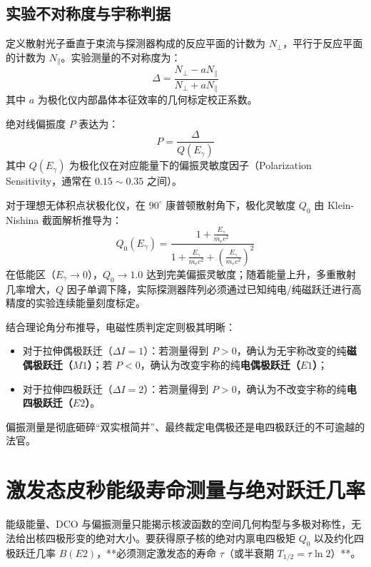 \subsection{实验不对称度与宇称判据}

定义散射光子垂直于束流与探测器构成的反应平面的计数为 $N_\perp$，平行于反应平面的计数为 $N_\parallel$。实验测量的不对称度为：
\begin{equation}
    \Delta = \frac{N_\perp - a N_\parallel}{N_\perp + a N_\parallel}
\end{equation}
其中 $a$ 为极化仪内部晶体本征效率的几何标定校正系数。

绝对线偏振度 $P$ 表达为：
\begin{equation}
    P = \frac{\Delta}{Q(E_\gamma)}
\end{equation}
其中 $Q(E_\gamma)$ 为极化仪在对应能量下的偏振灵敏度因子（Polarization Sensitivity，通常在 $0.15 \sim 0.35$ 之间）。

对于理想无体积点状极化仪，在 $90^\circ$ 康普顿散射角下，极化灵敏度 $Q_0$ 由 Klein-Nishina 截面解析推导为：
\begin{equation}
    Q_0(E_\gamma) = \frac{1 + \frac{E_\gamma}{m_e c^2}}{1 + \frac{E_\gamma}{m_e c^2} + \left(\frac{E_\gamma}{m_e c^2}\right)^2}
    \label{eq:polarimeter_sensitivity}
\end{equation}
在低能区（$E_\gamma \to 0$），$Q_0 \to 1.0$ 达到完美偏振灵敏度；随着能量上升，多重散射几率增大，$Q$ 因子单调下降，实际探测器阵列必须通过已知纯电/纯磁跃迁进行高精度的实验连续能量刻度标定。

结合理论角分布推导，电磁性质判定定则极其明晰：
\begin{itemize}
    \item 对于拉伸偶极跃迁（$\Delta I = 1$）：若测量得到 $P > 0$，确认为无宇称改变的纯\textbf{磁偶极跃迁（$M1$）}；若 $P < 0$，确认为改变宇称的纯\textbf{电偶极跃迁（$E1$）}；
    \item 对于拉伸四极跃迁（$\Delta I = 2$）：若测量得到 $P > 0$，确认为不改变宇称的纯\textbf{电四极跃迁（$E2$）}。
\end{itemize}
偏振测量是彻底砸碎“双实根简并”、最终裁定电偶极还是电四极跃迁的不可逾越的法官。

\section{激发态皮秒能级寿命测量与绝对跃迁几率}
\label{sec:lifetime_measurements}

能级能量、DCO 与偏振测量只能揭示核波函数的空间几何构型与多极对称性，无法给出核四极形变的绝对大小。要获得原子核的绝对内禀电四极矩 $Q_0$ 以及约化四极跃迁几率 $B(E2)$，**必须测定激发态的寿命 $\tau$（或半衰期 $T_{1/2} = \tau \ln 2$）**。

